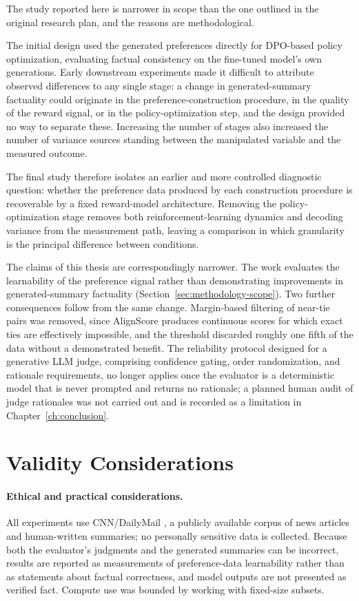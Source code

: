 The study reported here is narrower in scope than the one outlined in the original
research plan, and the reasons are methodological.

The initial design used the generated preferences directly for DPO-based policy
optimization, evaluating factual consistency on the fine-tuned model's own
generations. Early downstream experiments made it difficult to attribute observed
differences to any single stage: a change in generated-summary factuality could
originate in the preference-construction procedure, in the quality of the reward
signal, or in the policy-optimization step, and the design provided no way to
separate these. Increasing the number of stages also increased the number of
variance sources standing between the manipulated variable and the measured
outcome.

The final study therefore isolates an earlier and more controlled diagnostic
question: whether the preference data produced by each construction procedure is
recoverable by a fixed reward-model architecture. Removing the policy-optimization
stage removes both reinforcement-learning dynamics and decoding variance from the
measurement path, leaving a comparison in which granularity is the principal
difference between conditions.

The claims of this thesis are correspondingly narrower. The work evaluates the
learnability of the preference signal rather than demonstrating improvements in
generated-summary factuality (Section~\ref{sec:methodology-scope}). Two further
consequences follow from the same change. Margin-based filtering of near-tie pairs
was removed, since AlignScore produces continuous scores for which exact ties are
effectively impossible, and the threshold discarded roughly one fifth of the data
without a demonstrated benefit. The reliability protocol designed for a generative
LLM judge, comprising confidence gating, order randomization, and rationale
requirements, no longer applies once the evaluator is a deterministic model that
is never prompted and returns no rationale; a planned human audit of judge
rationales was not carried out and is recorded as a limitation in
Chapter~\ref{ch:conclusion}.

\section{Validity Considerations}
\label{sec:methodology-ethics}

\paragraph{Ethical and practical considerations.} All experiments use
CNN/DailyMail \citep{hermann2015teaching, nallapati2016abstractive}, a publicly
available corpus of news articles and human-written summaries; no personally
sensitive data is collected. Because both the evaluator's
judgments and the generated summaries can be incorrect, results are reported as
measurements of preference-data learnability rather than as statements about
factual correctness, and model outputs are not presented as verified fact. Compute
use was bounded by working with fixed-size subsets.

